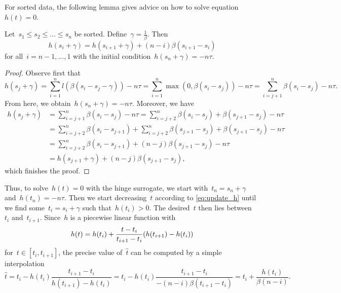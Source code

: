 For sorted data, the following lemma gives advice on how to solve equation~$h(t)=0$. 

\begin{lemma}
  Let~$s_1\le s_2 \le \dots \le s_n$ be sorted. Define~$\gamma= \frac{1}{\beta}$. Then 
  \begin{equation}\label{eq:update_h}
    h(s_i+\gamma) = h(s_{i+1}+\gamma) + (n-i)\beta(s_{i+1}-s_i)
  \end{equation}
  for all~$i=n-1,\dots,1$ with the initial condition~$h(s_n+\gamma)=-n\tau$.
\end{lemma}
\begin{proof}
Observe first that
\begin{equation*}
  h(s_j+\gamma)
  = \sum_{i=1}^n l(\beta(s_i-s_j-\gamma)) - n\tau
  = \sum_{i=1}^n\max(0,\beta(s_i-s_j)) - n\tau
  = \sum_{i=j+1}^n \beta(s_i-s_j) - n\tau.
\end{equation*}
From here, we obtain~$h(s_n+\gamma)=-n\tau$. Moreover, we have
\begin{equation*}
  \begin{aligned}
    h(s_j+\gamma)
    & = \sum_{i=j+1}^n \beta(s_i - s_j) - n\tau
      = \sum_{i=j+2}^n \beta(s_i - s_{j}) + \beta(s_{j+1}-s_{j})- n\tau \\
    & = \sum_{i=j+2}^n \beta(s_i - s_{j+1}) + \sum_{i=j+2}^n\beta(s_{j+1}-s_j) + \beta(s_{j+1}-s_{j})- n\tau \\
    & = \sum_{i=j+2}^n \beta(s_i-s_{j+1}) + (n-j)\beta(s_{j+1}-s_j)- n\tau \\
    & = h(s_{j+1}+\gamma) + (n-j)\beta(s_{j+1}-s_j),
  \end{aligned}
\end{equation*}
which finishes the proof.
\end{proof}

Thus, to solve~$h(t)=0$ with the hinge surrogate, we start with~$t_n=s_n+\gamma$ and~$h(t_n)=-n\tau$. Then we start decreasing~$t$ according to \eqref{eq:update_h} until we find some~$t_i=s_i+\gamma$ such that~$h(t_i)>0$. The desired~$t$ then lies between~$t_i$ and~$t_{i+1}$. Since~$h$ is a piecewise linear function with
\begin{equation*}
  h(t) = h(t_i) + \frac{t-t_i}{t_{i+1}-t_i}\Brac{h(t_{i+1})-h(t_i)}
\end{equation*}
for~$t\in [t_i,t_{i+1}]$, the precise value of~$\hat{t}$ can be computed by a simple interpolation
\begin{equation*}
  \hat{t}
  = t_i - h(t_i)\frac{t_{i+1}-t_i}{h(t_{i+1})-h(t_i)}
  = t_i - h(t_i)\frac{t_{i+1}-t_i}{-(n-i)\beta(t_{i+1}-t_{i})}
  = t_i + \frac{h(t_i)}{\beta(n-i)}.
\end{equation*}

